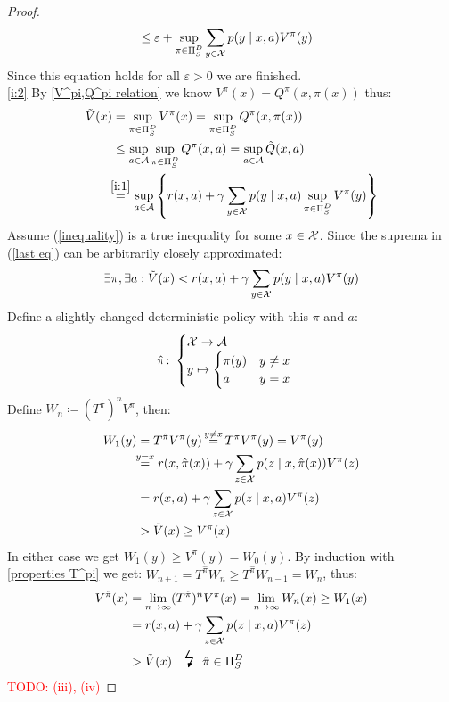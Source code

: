 \begin{proof}
\begin{align*}
		&\le \varepsilon + \sup_{\pi\in\Pi_S^D} \sum_{y\in\mathcal{X}}p(y\mid x,a) V^\pi(y)
	\end{align*}
	Since this equation holds for all \(\varepsilon>0\) we are finished.
	\\
	\ref{i:2}
	By \ref{V^pi,Q^pi relation} we know \(V^\pi(x)=Q^\pi(x,\pi(x))\) thus:
	\begin{align}
		\tilde{V}(x)& =\sup_{\pi \in \detPolicy} V^\pi(x)
		=\sup_{\pi \in \detPolicy}Q^\pi(x,\pi(x)) 
		\nonumber\\
		&\le\sup_{a\in \cA} \sup_{\pi\in\detPolicy} Q^\pi(x,a)
		=\sup_{a\in \cA} \tilde{Q}(x,a)
		\label{inequality}
		\\
		&\lxeq{\ref{i:1}} \sup_{a\in \cA}\left\{ r(x,a)+\gamma\sum\limits_{y\in\cX}p(y\mid x,a) 
		\sup_{\pi\in\detPolicy} V^\pi(y) \right\} \label{last eq}
	\end{align}
	Assume (\ref{inequality}) is a true inequality for some \(x\in\mathcal{X}\). Since the suprema in (\ref{last eq}) can be arbitrarily closely approximated:
	\[ \exists \pi, \exists a : \tilde{V}(x) < r(x,a) + \gamma\sum_{y\in\mathcal{X}} p(y\mid x,a) V^\pi(y)\]
	Define a slightly changed deterministic policy with this \(\pi\) and \(a\):
	\begin{align*}
		\hat{\pi}\colon
		\begin{cases}
			\mathcal{X}\to\mathcal{A}\\
			y\mapsto
			\begin{cases}
				\pi(y) & y\neq x\\
				a & y=x
			\end{cases}
		\end{cases}
	\end{align*}
	Define \(W_n\coloneqq (T^{\hat{\pi}})^n V^\pi\), then:
	\begin{align*}
		W_1(y)&=T^{\hat{\pi}}V^\pi(y) \xeq{y\neq x} T^\pi V^\pi(y) = V^\pi(y)\\
		&\lxeq{y=x} r(x, \hat{\pi}(x)) 
		+ \gamma \sum_{z\in\cX} p(z \mid x, \hat{\pi}(x)) V^\pi(z)  \\
		&=r(x, a) + \gamma \sum_{z\in\cX} p(z \mid x, a) V^\pi(z) \\
		&> \tilde{V}(x) \ge V^\pi(x)
	\end{align*}
	In either case we get \(W_1(y)\ge V^\pi(y)=W_0(y) \).
	By induction with \ref{properties T^pi} we get: \(W_{n+1}=T^{\hat{\pi}}W_n \ge T^{\hat{\pi}}W_{n-1}=W_n\), thus:
	\begin{align*}
		V^{\hat{\pi}}(x)&=\lim_{n\to\infty}(T^{\hat{\pi}})^n V^\pi(x)=\lim_{n\to\infty} W_n(x)\ge W_1(x) \\
		&=r(x, a) + \gamma \sum_{z\in\cX} p(z \mid x, a) V^\pi(z) \\
		&> \tilde{V}(x) \contradiction{\hat{\pi}\in\detPolicy}
	\end{align*}
\textcolor{red}{TODO: (iii), (iv)}
\end{proof}


